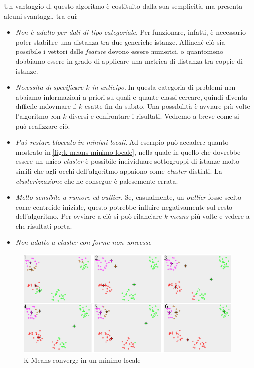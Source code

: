 Un vantaggio di questo algoritmo è costituito dalla sua semplicità, ma presenta alcuni svantaggi, tra cui:
\begin{itemize}
\item\emph{ Non è adatto per dati di tipo categoriale}. Per funzionare, infatti, è necessario poter stabilire una distanza tra due generiche istanze. Affinché ciò sia possibile i vettori delle \emph{feature} devono essere numerici, o quantomeno dobbiamo essere in grado di applicare una metrica di distanza tra coppie di istanze.
\item\emph{Necessita di specificare $k$ in anticipo}. In questa categoria di problemi non abbiamo informazioni a priori su quali e quante classi cercare, quindi diventa difficile indovinare il $k$ esatto fin da subito. Una possibilità è avviare più volte l'algoritmo con $k$ diversi e confrontare i risultati. Vedremo a breve come si può realizzare ciò.
\item\emph{Può restare bloccato in minimi locali}. Ad esempio può accadere quanto mostrato in \autoref{fig:k-means-minimo-locale}, nella quale in quello che dovrebbe essere un unico \emph{cluster} è possibile individuare sottogruppi di istanze molto simili che agli occhi dell'algoritmo appaiono come \emph{cluster} distinti. La \emph{clusterizzazione} che ne consegue è palesemente errata.
\item\emph{Molto sensibile a rumore ed outlier}. Se, casualmente, un \emph{outlier} fosse scelto come centroide iniziale, questo potrebbe influire negativamente sul resto dell'algoritmo. Per ovviare a ciò si può rilanciare \emph{k-means} più volte e vedere a che risultati porta.
\item\emph{Non adatto a cluster con forme non convesse}.
\end{itemize}


\begin{figure}[tbp]
\centering
  \includegraphics[width = \textwidth]{images/k-means-minimo-locale}
  \caption{K-Means converge in un minimo locale}
  \label{fig:k-means-minimo-locale}
\end{figure}

